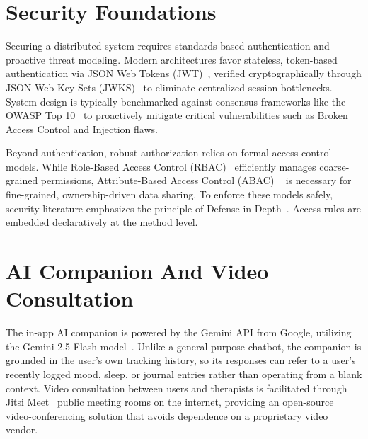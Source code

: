 \section{Security Foundations}

Securing a distributed system requires standards-based authentication and proactive threat modeling. Modern architectures favor stateless, token-based authentication via JSON Web Tokens (JWT)~\cite{2015-RFC7519-JWT}, verified cryptographically through JSON Web Key Sets (JWKS)~\cite{2015-RFC7517-JWK} to eliminate centralized session bottlenecks. System design is typically benchmarked against consensus frameworks like the OWASP Top 10~\cite{2021-OWASP-Top10} to proactively mitigate critical vulnerabilities such as Broken Access Control and Injection flaws.

Beyond authentication, robust authorization relies on formal access control models. While Role-Based Access Control (RBAC)~\cite{1996-Sandhu-RBAC} efficiently manages coarse-grained permissions, Attribute-Based Access Control (ABAC) ~\cite{2014-NIST-ABAC} is necessary for fine-grained, ownership-driven data sharing. To enforce these models safely, security literature emphasizes the principle of Defense in Depth~\cite{1975-Saltzer-Schroeder}. Access rules are embedded declaratively at the method level.

\section{AI Companion And Video Consultation}

The in-app AI companion is powered by the Gemini API from Google, utilizing the Gemini 2.5 Flash model~\cite{2024-Gemini-TechReport}. Unlike a general-purpose chatbot, the companion is grounded in the user's own tracking history, so its responses can refer to a user's recently logged mood, sleep, or journal entries rather than operating from a blank context. Video consultation between users and therapists is facilitated through Jitsi Meet~\cite{Jitsi} public meeting rooms on the internet, providing an open-source video-conferencing solution that avoids dependence on a proprietary video vendor.